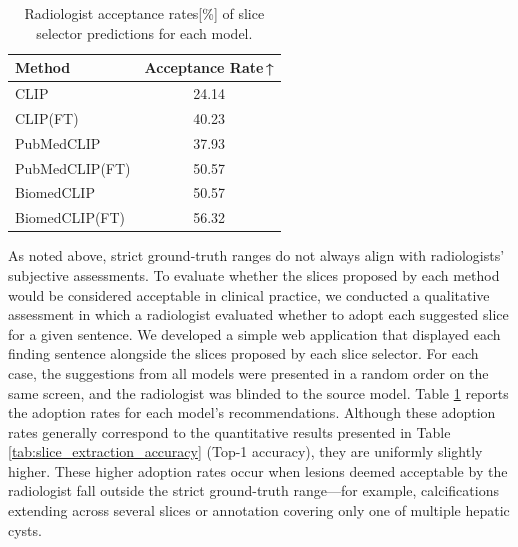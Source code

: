\documentclass[bioengineering,article,submit,pdftex,moreauthors]{Definitions/mdpi}
\begin{document}
\begin{table}[ht]
  \centering
  \caption{Radiologist acceptance rates[\%] of slice selector predictions for each model.}
  \label{tab:slice_selector_adoption}
  \begin{tabular}{lc}
    \toprule
    Method                  & Acceptance Rate\,↑ \\
    \midrule
    CLIP                    & 24.14        \\
    CLIP(FT)                & 40.23        \\
    PubMedCLIP              & 37.93        \\
    PubMedCLIP(FT)          & 50.57        \\
    BiomedCLIP              & 50.57        \\
    BiomedCLIP(FT)          & 56.32        \\
    \bottomrule
  \end{tabular}
\end{table}


As noted above, strict ground-truth ranges do not always align with radiologists’ subjective assessments.
To evaluate whether the slices proposed by each method would be considered acceptable in clinical practice, we conducted a qualitative assessment in which a radiologist evaluated whether to adopt each suggested slice for a given sentence. 
We developed a simple web application that displayed each finding sentence alongside the slices proposed by each slice selector. 
For each case, the suggestions from all models were presented in a random order on the same screen, and the radiologist was blinded to the source model. 
Table \ref{tab:slice_selector_adoption} reports the adoption rates for each model’s recommendations. 
Although these adoption rates generally correspond to the quantitative results presented in Table \ref{tab:slice_extraction_accuracy} (Top-1 accuracy), they are uniformly slightly higher. 
These higher adoption rates occur when lesions deemed acceptable by the radiologist fall outside the strict ground-truth range—for example, calcifications extending across several slices or annotation covering only one of multiple hepatic cysts.
\end{document}
